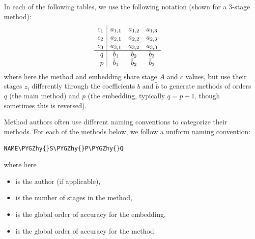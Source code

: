 \documentclass[letterpaper,10pt,english]{sphinxmanual}
\def\PYGZhy{\char`\-}
\begin{document}
In each of the following tables, we use the following notation (shown
for a 3-stage method):
\begin{gather}
\begin{split}\begin{array}{r|ccc}
  c_1 & a_{1,1} & a_{1,2} & a_{1,3} \\
  c_2 & a_{2,1} & a_{2,2} & a_{2,3} \\
  c_3 & a_{3,1} & a_{3,2} & a_{3,3} \\
  \hline
  q & b_1 & b_2 & b_3 \\
  p & \tilde{b}_1 & \tilde{b}_2 & \tilde{b}_3
\end{array}\end{split}\notag
\end{gather}
where here the method and embedding share stage \(A\) and
\(c\) values, but use their stages \(z_i\) differently through
the coefficients \(b\) and \(\tilde{b}\) to generate methods
of orders \(q\) (the main method) and \(p\) (the embedding,
typically \(q = p+1\), though sometimes this is reversed).

Method authors often use different naming conventions to categorize
their methods.  For each of the methods below, we follow a uniform
naming convention:

\begin{Verbatim}[commandchars=\\\{\}]
NAME\PYGZhy{}S\PYGZhy{}P\PYGZhy{}Q
\end{Verbatim}

where here
\begin{itemize}
\item {} 
 is the author (if applicable),

\item {} 
 is the number of stages in the method,

\item {} 
 is the global order of accuracy for the embedding,

\item {} 
 is the global order of accuracy for the method.

\end{itemize}
\end{document}

